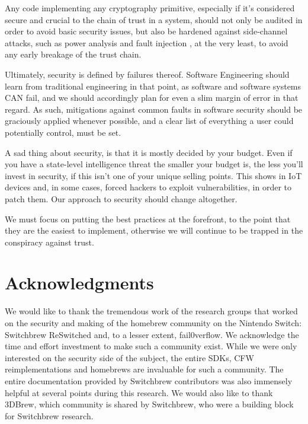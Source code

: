 \documentclass[journal]{IEEEtran}
\begin{document}
Any code implementing any cryptography primitive, especially if it's considered secure and crucial
to the chain of trust in a system, should not only be audited in order to avoid basic security
issues, but also be hardened against side-channel attacks, such as power analysis and fault
injection \cite{yifan_dfa}, at the very least, to avoid any early breakage of the trust chain.

Ultimately, security is defined by failures thereof. Software Engineering should learn from
traditional engineering in that point, as software and software systems CAN fail, and we should
accordingly plan for even a slim margin of error in that regard. As such, mitigations against
common faults in software security should be graciously applied whenever possible, and a clear list
of everything a user could potentially control, must be set. 

A sad thing about security, is that it is mostly decided by your budget.
Even if you have a state-level intelligence threat the smaller your budget is, the less you'll
invest in security, if this isn't one of your unique selling points. 
This shows in IoT devices and, in some cases, forced hackers to exploit vulnerabilities, in order to
patch them. Our approach to security should change altogether.

We must focus on putting the best practices at the forefront, to the point that they are the easiest
to implement, otherwise we will continue to be trapped in the conspiracy against trust.

\section*{Acknowledgments}
We would like to thank the tremendous work of the research groups that worked
on the security and making of the homebrew community on the Nintendo Switch:
Switchbrew ReSwitched and, to a lesser extent, fail0verflow. We acknowledge
the time and effort investment to make such a community exist. While we were
only interested on the security side of the subject, the entire SDKs, CFW
reimplementations and homebrews are invaluable for such a community. The entire
documentation provided by Switchbrew contributors was also immensely helpful at
several points during this research. We would also like to thank 3DBrew, which
community is shared by Switchbrew, who were a building block for Switchbrew
research.




\end{document}
